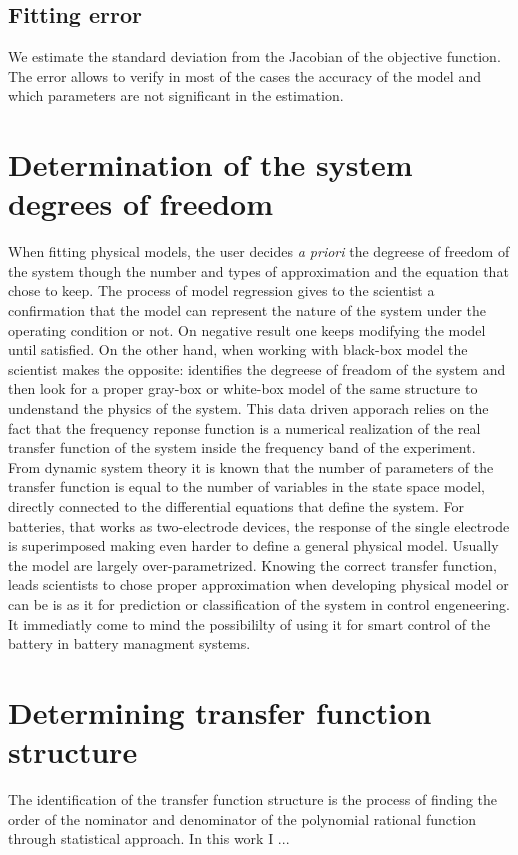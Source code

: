 \subsection{Fitting error}
We estimate the standard deviation from the Jacobian of the objective function. The error allows to verify in most of the cases the accuracy of the model and which parameters are not significant in the estimation.

\section{Determination of the system degrees of freedom}

When fitting physical models, the user decides \emph{a priori} the degreese of freedom of the system though the number and types of approximation and the equation that chose to keep. The process of model regression gives to the scientist a confirmation that the model can represent the nature of the system under the operating condition or not. On negative result one keeps modifying the model until satisfied. On the other hand, when working with black-box model the scientist makes the opposite: identifies the degreese of freadom of the system and then look for a proper gray-box or white-box model of the same structure to undenstand the physics of the system.  This data driven apporach relies on the fact that the frequency reponse function is a numerical realization of the real transfer function of the system inside the frequency band of the experiment. From dynamic system theory it is known that the number of parameters of the transfer function is equal to the number of variables in the state space model, directly connected to the differential equations that define the system. For batteries, that works as two-electrode devices, the response of the single electrode is superimposed making even harder to define a general physical model. Usually the model are largely over-parametrized. Knowing the correct transfer function, leads scientists to chose proper approximation when developing physical model or can be is as it for prediction or classification of the system in control engeneering. It immediatly come to mind the possibililty of using it for smart control of the battery in battery managment systems. 

\section{Determining transfer function structure}
The identification of the transfer function structure is the process of finding the order of the nominator and denominator of the polynomial rational function through statistical approach. In this work I ... 